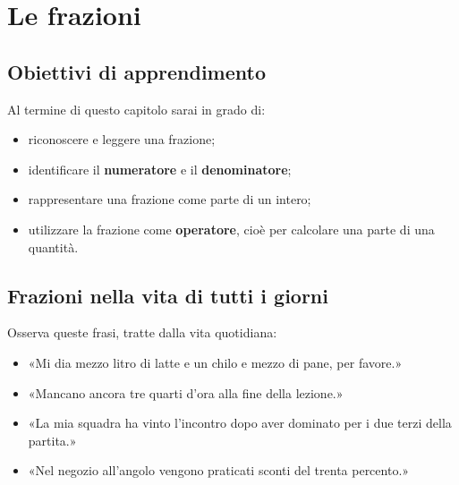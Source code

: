 
\chapter{Le frazioni}

\section*{Obiettivi di apprendimento}

Al termine di questo capitolo sarai in grado di:

\begin{itemize}[leftmargin=1.5em]
    \item riconoscere e leggere una frazione;
    \item identificare il \textbf{numeratore} e il \textbf{denominatore};
    \item rappresentare una frazione come parte di un intero;
    \item utilizzare la frazione come \textbf{operatore}, cioè per calcolare una parte di una quantità.
\end{itemize}

\section{Frazioni nella vita di tutti i giorni}

Osserva queste frasi, tratte dalla vita quotidiana:

\begin{itemize}[leftmargin=1.5em]
    \item «Mi dia mezzo litro di latte e un chilo e mezzo di pane, per favore.»
    \item «Mancano ancora tre quarti d'ora alla fine della lezione.»
    \item «La mia squadra ha vinto l'incontro dopo aver dominato per i due terzi della partita.»
    \item «Nel negozio all'angolo vengono praticati sconti del trenta percento.»
\end{itemize}

